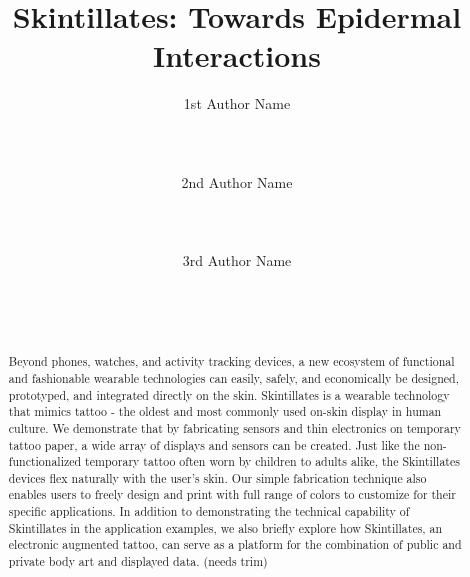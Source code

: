 \documentclass{sigchi}
\begin{document}
\title{Skintillates: Towards Epidermal Interactions}

\author{
  \alignauthor 1st Author Name\\
    \\
    \\
    \\
  \alignauthor 2nd Author Name\\
    \\
    \\
    \\
  \alignauthor 3rd Author Name\\
    \\
    \\
    \\
}

\maketitle

\begin{abstract}
Beyond phones, watches, and activity tracking devices, a new ecosystem of functional and fashionable wearable technologies can easily, safely, and economically be designed, prototyped, and integrated directly on the skin. Skintillates is a wearable technology that mimics tattoo - the oldest and most commonly used on-skin display in human culture. We demonstrate that by fabricating sensors and thin electronics on temporary tattoo paper, a wide array of displays and sensors can be created. Just like the non-functionalized temporary tattoo often worn by children to adults alike, the Skintillates devices flex naturally with the user's skin. Our simple fabrication technique also enables users to freely design and print with full range of colors to customize for their specific applications. In addition to demonstrating the technical capability of Skintillates in the application examples, we also briefly explore how Skintillates, an electronic augmented tattoo, can serve as a platform for the combination of public and private body art and displayed data. (needs trim) 
\end{abstract}

\end{document}
